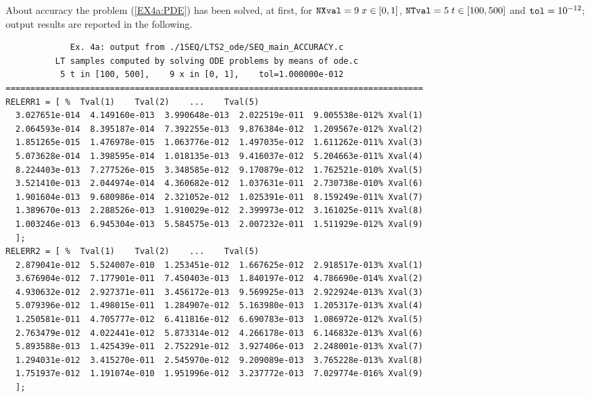 \documentclass[a4paper,10pt]{report}%
\begin{document}
\newpage
About accuracy the problem (\ref{EX4a:PDE}) has been solved, at first, for ${\tt NXval}=9\; x\in[0,1]$,
${\tt NTval}=5\; t\in[100,500]$ and ${\tt tol}=10^{-12}$; output results are reported in the following.
\begin{lstlisting}
             Ex. 4a: output from ./1SEQ/LTS2_ode/SEQ_main_ACCURACY.c
          LT samples computed by solving ODE problems by means of ode.c
           5 t in [100, 500],    9 x in [0, 1],    tol=1.000000e-012
====================================================================================
RELERR1 = [ %  Tval(1)    Tval(2)    ...    Tval(5)
  3.027651e-014  4.149160e-013  3.990648e-013  2.022519e-011  9.005538e-012% Xval(1)
  2.064593e-014  8.395187e-014  7.392255e-013  9.876384e-012  1.209567e-012% Xval(2)
  1.851265e-015  1.476978e-015  1.063776e-012  1.497035e-012  1.611262e-011% Xval(3)
  5.073628e-014  1.398595e-014  1.018135e-013  9.416037e-012  5.204663e-011% Xval(4)
  8.224403e-013  7.277526e-015  3.348585e-012  9.170879e-012  1.762521e-010% Xval(5)
  3.521410e-013  2.044974e-014  4.360682e-012  1.037631e-011  2.730738e-010% Xval(6)
  1.901604e-013  9.680986e-014  2.321052e-012  1.025391e-011  8.159249e-011% Xval(7)
  1.389670e-013  2.288526e-013  1.910029e-012  2.399973e-012  3.161025e-011% Xval(8)
  1.003246e-013  6.945304e-013  5.584575e-013  2.007232e-011  1.511929e-012% Xval(9)
  ];
RELERR2 = [ %  Tval(1)    Tval(2)    ...    Tval(5)
  2.879041e-012  5.524007e-010  1.253451e-012  1.667625e-012  2.918517e-013% Xval(1)
  3.676904e-012  7.177901e-011  7.450403e-013  1.840197e-012  4.786690e-014% Xval(2)
  4.930632e-012  2.927371e-011  3.456172e-013  9.569925e-013  2.922924e-013% Xval(3)
  5.079396e-012  1.498015e-011  1.284907e-012  5.163980e-013  1.205317e-013% Xval(4)
  1.250581e-011  4.705777e-012  6.411816e-012  6.690783e-013  1.086972e-012% Xval(5)
  2.763479e-012  4.022441e-012  5.873314e-012  4.266178e-013  6.146832e-013% Xval(6)
  5.893588e-013  1.425439e-011  2.752291e-012  3.927406e-013  2.248001e-013% Xval(7)
  1.294031e-012  3.415270e-011  2.545970e-012  9.209089e-013  3.765228e-013% Xval(8)
  1.751937e-012  1.191074e-010  1.951996e-012  3.237772e-013  7.029774e-016% Xval(9)
  ];
\end{lstlisting}
\end{document}
